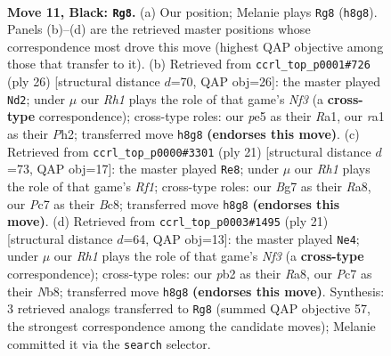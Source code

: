 \documentclass[11pt]{article}
\begin{document}
\clearpage

\begin{figure}[p]\centering
\begin{subfigure}{0.46\textwidth}\centering
\resizebox{\linewidth}{!}{%
\newchessgame
\chessboard[
  setfen={r3k2r/ppp1ppbp/1nn3p1/4P3/6b1/NB3N2/PPP2PPP/R1BK2R1 b kq - 2 11},
  showmover=false,
  pgfstyle=straightmove, color=movearrow, markmove={h8-g8}
]}
\caption{}
\end{subfigure}\hfill
\begin{subfigure}{0.46\textwidth}\centering
\resizebox{\linewidth}{!}{%
\newchessgame
\chessboard[
  setfen={r1b2rk1/pp3pp1/2n1pn1p/8/1bp5/2N1BNP1/PP2PPBP/R2R2K1 w - - 0 14},
  showmover=false,
  pgfstyle=straightmove, color=movearrow, markmove={f3-d2}
]}
\caption{}
\end{subfigure}
\\[4pt]
\begin{subfigure}{0.46\textwidth}\centering
\resizebox{\linewidth}{!}{%
\newchessgame
\chessboard[
  setfen={rnb2rk1/ppp2p1p/1n4p1/4b3/4P3/2N1B2P/PP3PP1/2R1KBNR b K - 1 11},
  showmover=false,
  pgfstyle=straightmove, color=movearrow, markmove={f8-e8}
]}
\caption{}
\end{subfigure}\hfill
\begin{subfigure}{0.46\textwidth}\centering
\resizebox{\linewidth}{!}{%
\newchessgame
\chessboard[
  setfen={rn2kb1r/1b3ppp/p3pn2/1pP5/2P5/1B3N1P/PP3PP1/R1BNK2R b KQkq - 0 11},
  showmover=false,
  pgfstyle=straightmove, color=movearrow, markmove={f6-e4}
]}
\caption{}
\end{subfigure}
\caption{\textbf{Move 11, Black: \texttt{Rg8}.} (a) Our position; Melanie plays \texttt{Rg8} (\texttt{h8g8}). Panels (b)--(d) are the retrieved master positions whose correspondence most drove this move (highest QAP objective among those that transfer to it). (b) Retrieved from \texttt{ccrl\_top\_p0001\#726} (ply 26) [structural distance $d$=70, QAP obj=26]: the master played \texttt{Nd2}; under $\mu$ our \emph{Rh1} plays the role of that game's \emph{Nf3} (a \textbf{cross-type} correspondence); cross-type roles: our \emph{p}e5 as their \emph{R}a1, our \emph{r}a1 as their \emph{P}h2; transferred move \texttt{h8g8} \textbf{(endorses this move)}. (c) Retrieved from \texttt{ccrl\_top\_p0000\#3301} (ply 21) [structural distance $d$=73, QAP obj=17]: the master played \texttt{Re8}; under $\mu$ our \emph{Rh1} plays the role of that game's \emph{Rf1}; cross-type roles: our \emph{B}g7 as their \emph{R}a8, our \emph{P}c7 as their \emph{B}c8; transferred move \texttt{h8g8} \textbf{(endorses this move)}. (d) Retrieved from \texttt{ccrl\_top\_p0003\#1495} (ply 21) [structural distance $d$=64, QAP obj=13]: the master played \texttt{Ne4}; under $\mu$ our \emph{Rh1} plays the role of that game's \emph{Nf3} (a \textbf{cross-type} correspondence); cross-type roles: our \emph{p}b2 as their \emph{R}a8, our \emph{P}c7 as their \emph{N}b8; transferred move \texttt{h8g8} \textbf{(endorses this move)}. Synthesis: 3 retrieved analogs transferred to \texttt{Rg8} (summed QAP objective 57, the strongest correspondence among the candidate moves); Melanie committed it via the \texttt{search} selector.}
\label{fig:thought-m21}
\end{figure}
\end{document}
